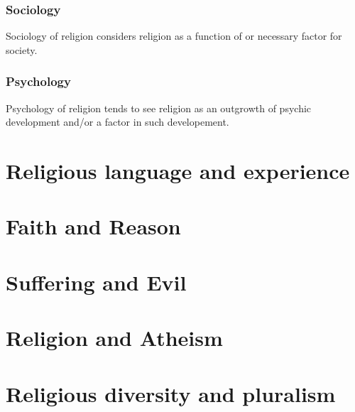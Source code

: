 \documentclass{article}
\begin{document}
\subsubsection{Sociology}

Sociology of religion considers religion as a function of or necessary factor for society.

\subsubsection{Psychology}

Psychology of religion tends to see religion as an outgrowth of psychic development and/or a factor in such developement.

\section{Religious language and experience}

\section{Faith and Reason}

\section{Suffering and Evil}

\section{Religion and Atheism}

\section{Religious diversity and pluralism}
\end{document}
